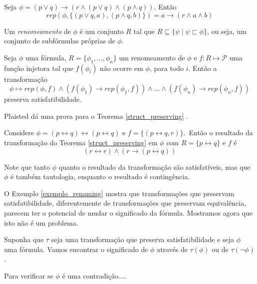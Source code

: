 \begin{example}
	Seja $\phi = (p \vee q) \rightarrow (r \wedge (p \vee q) \wedge (p \wedge q))$. Então $$rep(\phi,\{(p \vee q,a),(p \wedge q,b)\}) = a \rightarrow (r \wedge a \wedge b)$$
\end{example}

\begin{definition}
	Um \emph{renomeamento} de $\phi$ é um conjunto $R$ tal que $R \subseteq \{\psi \mid \psi \sqsubset \phi \}$, ou seja, um conjunto de subfórmulas próprias de $\phi$.
\end{definition}

\begin{theorem}
	\label{struct_preserving}
	Seja $\phi$ uma fórmula, $R = \{\phi_1,...,\phi_n\}$ um renomeamento de $\phi$ e $f : R \longmapsto \mathcal{P}$ uma função injetora tal que $f(\phi_i)$ não ocorre em $\phi$, para todo $i$. Então a transformação $$\phi \longmapsto rep(\phi,f) \wedge (f(\phi_1) \rightarrow rep(\phi_1,f)) \wedge ... \wedge (f(\phi_n) \rightarrow rep(\phi_n,f))$$
    preserva satisfatibilidade.
\end{theorem}

Plaisted dá uma prova para o Teorema \ref{struct_preserving} \cite{plaisted1986structure}.

\begin{example}
	\label{exemplo_renaming}
    Considere $\phi = (p \leftrightarrow q) \leftrightarrow (p \leftrightarrow q)$ e $f = \{(p \leftrightarrow q, r) \}$.\ Então o resultado da transformação do Teorema \ref{struct_preserving} em $\phi$ com $R = \{p \leftrightarrow q\}$ e $f$ é $$(r \leftrightarrow r) \wedge (r \rightarrow (p \leftrightarrow q))$$
    
    Note que tanto $\phi$ quanto o resultado da transformação são satisfatíveis, mas que $\phi$ é também tautologia, enquanto o resultado é contingência.
\end{example}

O Exemplo \ref{exemplo_renaming} mostra que transformações que preservam satisfatibilidade, diferentemente de transformações que preservam equivalência, parecem ter o potencial de mudar o significado da fórmula. Mostramos agora que isto não é um problema.

Suponha que $\tau$ seja uma transformação que preserva satisfatibilidade e seja $\phi$ uma fórmula. Vamos encontrar o significado de $\phi$ através de $\tau(\phi)$ ou de $\tau(\neg \phi)$.

Para verificar se $\phi$ é uma contradição....



